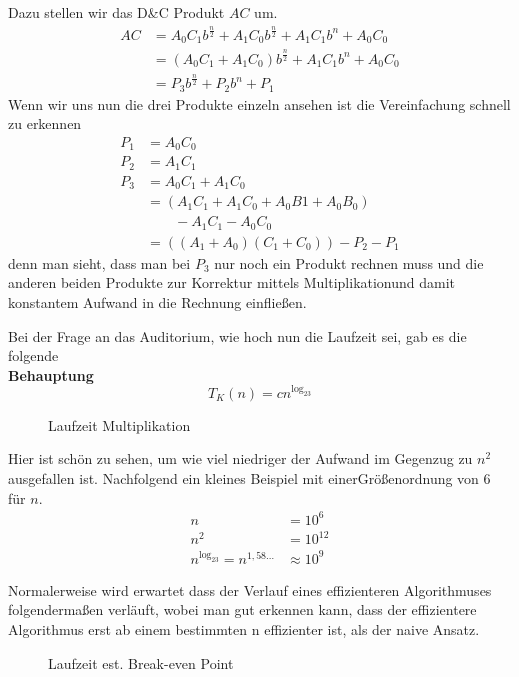 Dazu stellen wir das D\&C Produkt $AC$ um.
\begin{align*}
AC&=A_0C_1b^{\frac{n}{2}}+A_1C_0b^{\frac{n}{2}}+A_1C_1b^n+A_0C_0\\
&=\left(A_0C_1+A_1C_0\right)b^{\frac{n}{2}}+A_1C_1b^n+A_0C_0\\
&=P_3b^{\frac{n}{2}}+P_2b^n+P_1
\end{align*}
Wenn wir uns nun die drei Produkte einzeln ansehen ist die Vereinfachung schnell zu erkennen
\begin{align*}
P_1&=A_0C_0\\
P_2&=A_1C_1\\
P_3&=A_0C_1+A_1C_0\\
&=(A_1C_1+A_1C_0+A_0B1+A_0B_0)\\
&\qquad {}-A_1C_1-A_0C_0\\
&=\left((A_1+A_0)(C_1+C_0)\right)-P_2-P_1
\end{align*}
denn man sieht, dass man bei $P_3$ nur noch ein Produkt rechnen muss und die anderen beiden Produkte zur Korrektur mittels Multiplikation\linebreak und damit konstantem Aufwand in die Rechnung einfließen.

Bei der Frage an das Auditorium, wie hoch nun die Laufzeit sei, gab es die folgende\\[.5em]
\textbf{Behauptung}
$$T_K(n)=cn^{\log_23}$$
\begin{figure}[h]
\caption{Laufzeit Multiplikation}
\end{figure}
Hier ist schön zu sehen, um wie viel niedriger der Aufwand im Gegenzug zu $n^2$ ausgefallen ist. Nachfolgend ein kleines Beispiel mit einer\linebreak Größenordnung von 6 für $n$.
\begin{align*}
n&=10^6\\
n^2&=10^{12}\\
n^{\log_23}=n^{1,58\ldots}&\approx10^{9}
\end{align*}

Normalerweise wird erwartet dass der Verlauf eines effizienteren Algorithmuses folgendermaßen verläuft, wobei man gut erkennen kann, dass der effizientere Algorithmus erst ab einem bestimmten n effizienter ist, als der naive Ansatz.
\begin{figure}[H]
\caption{Laufzeit est. Break-even Point}
\end{figure}

